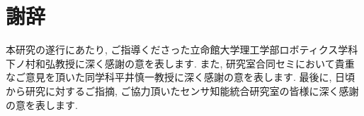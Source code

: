 \section*{謝辞}

本研究の遂行にあたり, ご指導くださった立命館大学理工学部ロボティクス学科 下ノ村和弘教授に深く感謝の意を表します. 
また, 研究室合同セミにおいて貴重なご意見を頂いた同学科平井慎一教授に深く感謝の意を表します. 
最後に, 日頃から研究に対するご指摘, ご協力頂いたセンサ知能統合研究室の皆様に深く感謝の意を表します. 
